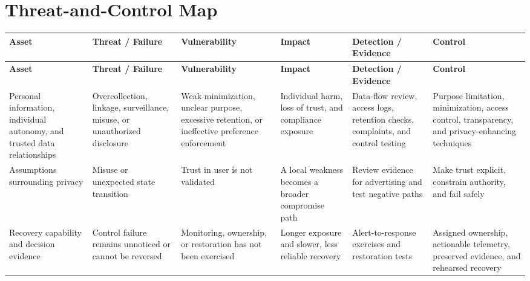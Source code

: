 \documentclass[11pt,letterpaper]{article}
\begin{document}
\section*{Threat-and-Control Map}
\begingroup\scriptsize\setlength{\tabcolsep}{2pt}
\begin{longtable}{>{\raggedright\arraybackslash}p{}>{\raggedright\arraybackslash}p{}>{\raggedright\arraybackslash}p{}>{\raggedright\arraybackslash}p{}>{\raggedright\arraybackslash}p{}>{\raggedright\arraybackslash}p{}}
\toprule\rowcolor{Navy}\color{white}\textbf{Asset} & \color{white}\textbf{Threat / Failure} & \color{white}\textbf{Vulnerability} & \color{white}\textbf{Impact} & \color{white}\textbf{Detection / Evidence} & \color{white}\textbf{Control}\\\midrule
\endfirsthead
\toprule\rowcolor{Navy}\color{white}\textbf{Asset} & \color{white}\textbf{Threat / Failure} & \color{white}\textbf{Vulnerability} & \color{white}\textbf{Impact} & \color{white}\textbf{Detection / Evidence} & \color{white}\textbf{Control}\\\midrule
\endhead
Personal information, individual autonomy, and trusted data relationships & Overcollection, linkage, surveillance, misuse, or unauthorized disclosure & Weak minimization, unclear purpose, excessive retention, or ineffective preference enforcement & Individual harm, loss of trust, and compliance exposure & Data-flow review, access logs, retention checks, complaints, and control testing & Purpose limitation, minimization, access control, transparency, and privacy-enhancing techniques\\\midrule
Assumptions surrounding privacy & Misuse or unexpected state transition & Trust in user is not validated & A local weakness becomes a broader compromise path & Review evidence for advertising and test negative paths & Make trust explicit, constrain authority, and fail safely\\\midrule
Recovery capability and decision evidence & Control failure remains unnoticed or cannot be reversed & Monitoring, ownership, or restoration has not been exercised & Longer exposure and slower, less reliable recovery & Alert-to-response exercises and restoration tests & Assigned ownership, actionable telemetry, preserved evidence, and rehearsed recovery\\\midrule
\bottomrule
\end{longtable}
\endgroup
\end{document}

